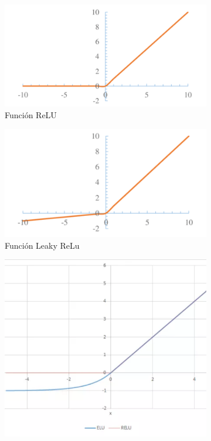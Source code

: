 \begin{figure}
{\begin{varwidth}{\textwidth}
        \begin{subfigure}[h]{0.45\textwidth} 
            \includegraphics[width=\textwidth]{imagenes/Cap4/relu}
            \caption{Funci\'{o}n ReLU}
            \label{fig:relu}
        \end{subfigure}       
        \begin{subfigure}[h]{0.45\textwidth} 
            \includegraphics[width=\textwidth]{imagenes/Cap4/l_relu}
            \caption{Funci\'{o}n Leaky ReLu}
            \label{fig:l_relu}
        \end{subfigure}
        \begin{subfigure}[h]{0.45\textwidth} 
            \includegraphics[width=\textwidth]{imagenes/Cap4/elu}

\end{subfigure}
\end{varwidth}}
\end{figure}
